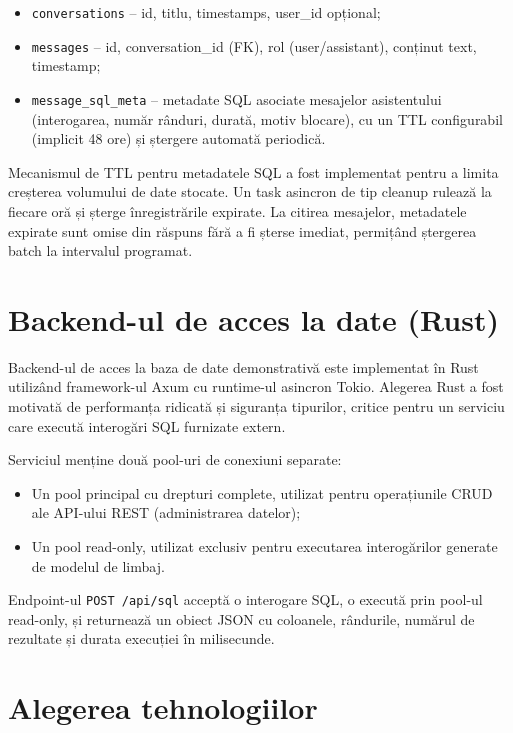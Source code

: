 \documentclass[12pt, a4paper]{report}
\newcommand{\code}[1]{\texttt{#1}}
\begin{document}
\begin{itemize}[nosep]
  \item \code{conversations} -- id, titlu, timestamps, user\_id opțional;
  \item \code{messages} -- id, conversation\_id (FK), rol (user/assistant), conținut text, timestamp;
  \item \code{message\_sql\_meta} -- metadate SQL asociate mesajelor asistentului (interogarea, număr rânduri, durată, motiv blocare), cu un TTL configurabil (implicit 48 ore) și ștergere automată periodică.
\end{itemize}

Mecanismul de TTL pentru metadatele SQL a fost implementat pentru a limita creșterea volumului de date stocate. Un task asincron de tip cleanup rulează la fiecare oră și șterge înregistrările expirate. La citirea mesajelor, metadatele expirate sunt omise din răspuns fără a fi șterse imediat, permițând ștergerea batch la intervalul programat.

\section{Backend-ul de acces la date (Rust)}

Backend-ul de acces la baza de date demonstrativă este implementat în Rust utilizând framework-ul Axum cu runtime-ul asincron Tokio. Alegerea Rust a fost motivată de performanța ridicată și siguranța tipurilor, critice pentru un serviciu care execută interogări SQL furnizate extern.

Serviciul menține două pool-uri de conexiuni separate:
\begin{itemize}[nosep]
  \item Un pool principal cu drepturi complete, utilizat pentru operațiunile CRUD ale API-ului REST (administrarea datelor);
  \item Un pool read-only, utilizat exclusiv pentru executarea interogărilor generate de modelul de limbaj.
\end{itemize}

Endpoint-ul \code{POST /api/sql} acceptă o interogare SQL, o execută prin pool-ul read-only, și returnează un obiect JSON cu coloanele, rândurile, numărul de rezultate și durata execuției în milisecunde.

\section{Alegerea tehnologiilor}
\end{document}
